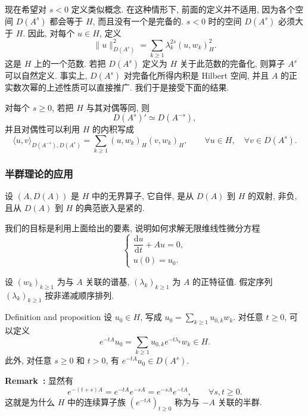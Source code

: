 现在希望对 $s<0$ 定义类似概念. 在这种情形下, 前面的定义并不适用, 因为各个空间 $D(A^s)$ 都会等于 $H$, 而且没有一个是完备的. $s<0$ 时的空间 $D(A^s)$ 必须大于 $H$. 因此, 对每个 $u\in H$, 定义
\[
 \|u\|_{D(A^s)}^2=\sum_{k\geq1}\lambda_k^{2s}(u,w_k)_H^2.
\]
这是 $H$ 上的一个范数. 若把 $D(A^s)$ 定义为 $H$ 关于此范数的完备化, 则算子 $A^s$ 可以自然定义. 事实上, $D(A^s)$ 对完备化所得内积是 Hilbert 空间, 并且 $A$ 的正实数次幂的上述性质可以直接推广. 我们于是接受下面的结果.

\begin{Proposition}
\label{prop:chap2-negative-power-duality}
对每个 $s\geq0$, 若把 $H$ 与其对偶等同, 则
\[
 D(A^s)'\simeq D(A^{-s}),
\]
并且对偶性可以利用 $H$ 的内积写成
\[
 \langle u,v\rangle_{D(A^{-s}),D(A^s)}
 =\sum_{k\geq1}(u,w_k)_H(v,w_k)_H,
 \qquad\forall u\in H,\quad\forall v\in D(A^s).
\]
\end{Proposition}

\subsubsection{半群理论的应用}
\label{subsec:chap2-semigroup-applications}

设 $(A,D(A))$ 是 $H$ 中的无界算子, 它自伴, 是从 $D(A)$ 到 $H$ 的双射, 非负, 且从 $D(A)$ 到 $H$ 的典范嵌入是紧的.

我们的目标是利用上面给出的要素, 说明如何求解无限维线性微分方程
\begin{equation}
 \begin{cases}
 \dfrac{\mathrm du}{\mathrm dt}+Au=0,\\
 u(0)=u_0.
 \end{cases}
 \label{eq:chap2-homogeneous-semigroup-problem}
\end{equation}

设 $(w_k)_{k\geq1}$ 为与 $A$ 关联的谱基, $(\lambda_k)_{k\geq1}$ 为 $A$ 的正特征值. 假定序列 $(\lambda_k)_{k\geq1}$ 按非递减顺序排列.

\begin{Proposition}{Definition and proposition}
\label{prop:chap2-semigroup-definition}
设 $u_0\in H$, 写成 $u_0=\sum_{k\geq1}u_{0,k}w_k$. 对任意 $t\geq0$, 可以定义
\[
 e^{-tA}u_0=\sum_{k\geq1}u_{0,k}e^{-t\lambda_k}w_k\in H.
\]
此外, 对任意 $s\geq0$ 和 $t>0$, 有 $e^{-tA}u_0\in D(A^s)$.
\end{Proposition}

\par\noindent{}\textbf{Remark~\thechaptersixremark:}\label{rem:chap2-semigroup-property}\quad
显然有
\[
 e^{-(t+s)A}=e^{-tA}e^{-sA}=e^{-sA}e^{-tA},
 \qquad\forall s,t\geq0.
\]
这就是为什么 $H$ 中的连续算子族 $(e^{-tA})_{t\geq0}$ 称为与 $-A$ 关联的半群.

